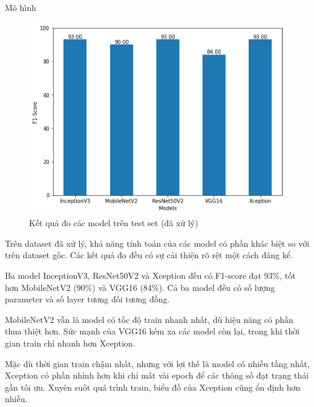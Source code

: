 \documentclass{beamer}
\begin{document}
\begin{frame}[allowframebreaks]{Mô hình}
	\begin{figure}[H]
		\centering
		\includegraphics[scale=0.5]{images/processed_score}
		\caption{Kết quả đo các model trên test set (đã xử lý)}
	\end{figure}
	
	Trên dataset đã xử lý, khả năng tính toán của các model có phần khác biệt so với trên dataset gốc. Các kết quả đo đều có sự cải thiện rõ rệt một cách đáng kể.

	\null

	Ba model InceptionV3, ResNet50V2 và Xception đều có F1-score đạt 93\%, tốt hơn MobileNetV2 (90\%) và VGG16 (84\%). Cả ba model đều có số lượng parameter và số layer tương đối tương đồng.

	\framebreak
	
	MobileNetV2 vẫn là model có tốc độ train nhanh nhất, dù hiệu năng có phần thua thiệt hơn. Sức mạnh của VGG16 kém xa các model còn lại, trong khi thời gian train chỉ nhanh hơn Xception.

	\null

	Mặc dù thời gian train chậm nhất, nhưng với lợi thế là model có nhiều tầng nhất, Xception có phần nhỉnh hơn khi chỉ mất vài epoch để các thông số đạt trạng thái gần tối ưu. Xuyên suốt quá trình train, biểu đồ của Xception cũng ổn định hơn nhiều.


\end{frame}
\end{document}
